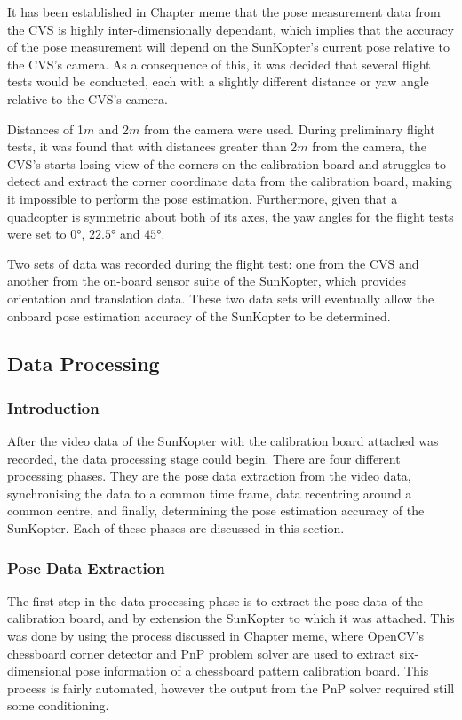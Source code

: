 It has been established in Chapter meme that the pose measurement data from the CVS is highly inter-dimensionally dependant, which implies that the accuracy of the pose measurement will depend on the SunKopter's current pose relative to the CVS's camera. As a consequence of this, it was decided that several flight tests would be conducted, each with a slightly different distance or yaw angle relative to the CVS's camera. 

Distances of 1$m$ and 2$m$ from the camera were used. During preliminary flight tests, it was found that with distances greater than 2$m$ from the camera, the CVS's starts losing view of the corners on the calibration board and struggles to detect and extract the corner coordinate data from the calibration board, making it impossible to perform the pose estimation. Furthermore, given that a quadcopter is symmetric about both of its axes, the yaw angles for the flight tests were set to $\ang{0}$, $\ang{22.5}$ and $\ang{45}$. 

Two sets of data was recorded during the flight test: one from the CVS and another from the on-board sensor suite of the SunKopter, which provides orientation and translation data. These two data sets will eventually allow the onboard pose estimation accuracy of the SunKopter to be determined. 

\subsection{Data Processing}

\subsubsection{Introduction}

After the video data of the SunKopter with the calibration board attached was recorded, the data processing stage could begin. There are four different processing phases. They are the pose data extraction from the video data, synchronising the data to a common time frame, data recentring around a common centre, and finally, determining the pose estimation accuracy of the SunKopter. Each of these phases are discussed in this section. 

\subsubsection{Pose Data Extraction}

The first step in the data processing phase is to extract the pose data of the calibration board, and by extension the SunKopter to which it was attached. This was done by using the process discussed in Chapter meme, where OpenCV's chessboard corner detector and PnP problem solver are used to extract six-dimensional pose information of a chessboard pattern calibration board. This process is fairly automated, however the output from the PnP solver required still some conditioning.

